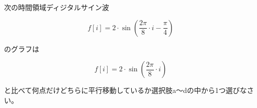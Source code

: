 次の時間領域ディジタルサイン波 

\[
f[i] = 2 \cdot \sin \left ( \frac{2 \pi}{8}  \cdot i - \frac{\pi}{4} \right )
\]

\noindent のグラフは

\[
f[i] = 2 \cdot \sin \left ( \frac{2 \pi}{8}  \cdot i \right )
\]

\noindent と比べて何点だけどちらに平行移動しているか選択肢a〜dの中から1つ選びなさい。
